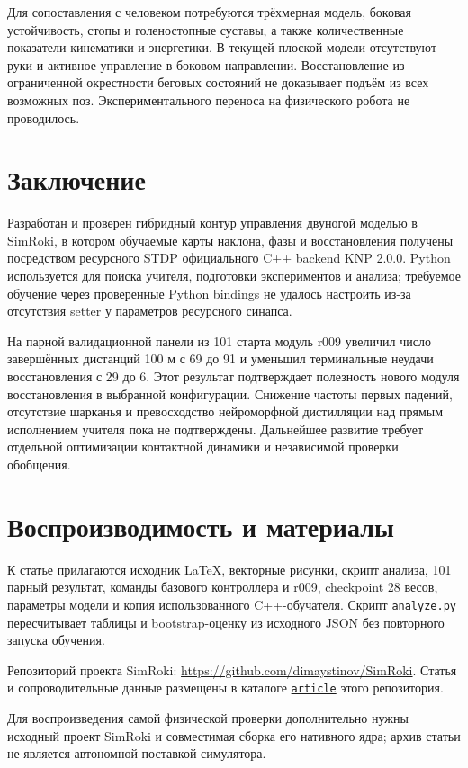 \documentclass[11pt,a4paper]{article}
\newcommand{\code}[1]{\texttt{#1}}
\begin{document}
Для сопоставления с человеком потребуются трёхмерная модель, боковая устойчивость, стопы и голеностопные суставы, а также количественные показатели кинематики и энергетики. В текущей плоской модели отсутствуют руки и активное управление в боковом направлении. Восстановление из ограниченной окрестности беговых состояний не доказывает подъём из всех возможных поз. Экспериментального переноса на физического робота не проводилось.

\section{Заключение}
Разработан и проверен гибридный контур управления двуногой моделью в SimRoki, в котором обучаемые карты наклона, фазы и восстановления получены посредством ресурсного STDP официального C++ backend KNP 2.0.0. Python используется для поиска учителя, подготовки экспериментов и анализа; требуемое обучение через проверенные Python bindings не удалось настроить из-за отсутствия setter у параметров ресурсного синапса.

На парной валидационной панели из 101 старта модуль r009 увеличил число завершённых дистанций 100 м с 69 до 91 и уменьшил терминальные неудачи восстановления с 29 до 6. Этот результат подтверждает полезность нового модуля восстановления в выбранной конфигурации. Снижение частоты первых падений, отсутствие шарканья и превосходство нейроморфной дистилляции над прямым исполнением учителя пока не подтверждены. Дальнейшее развитие требует отдельной оптимизации контактной динамики и независимой проверки обобщения.

\section*{Воспроизводимость и материалы}
К статье прилагаются исходник LaTeX, векторные рисунки, скрипт анализа, 101 парный результат, команды базового контроллера и r009, checkpoint 28 весов, параметры модели и копия использованного C++-обучателя. Скрипт \code{analyze.py} пересчитывает таблицы и bootstrap-оценку из исходного JSON без повторного запуска обучения.

Репозиторий проекта SimRoki: \url{https://github.com/dimaystinov/SimRoki}. Статья и сопроводительные данные размещены в каталоге \href{https://github.com/dimaystinov/SimRoki/tree/master/article}{\code{article}} этого репозитория.

Для воспроизведения самой физической проверки дополнительно нужны исходный проект SimRoki и совместимая сборка его нативного ядра; архив статьи не является автономной поставкой симулятора.
\end{document}
